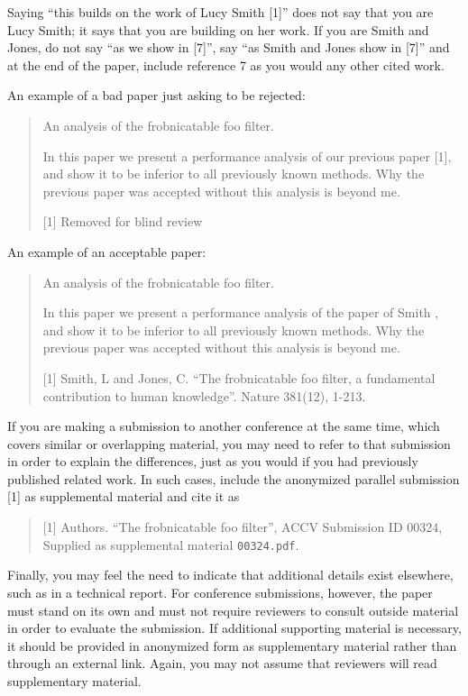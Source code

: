 \documentclass[runningheads]{llncs}
\begin{document}
Saying ``this builds on the work of Lucy Smith [1]'' does not say that you are Lucy Smith;
it says that you are building on her work.
If you are Smith and Jones, do not say ``as we show in [7]'', say ``as Smith and Jones show in [7]'' and at the end of the paper, include reference 7 as you would any other cited work.

An example of a bad paper just asking to be rejected:
\begin{quote}
  \begin{center}
      An analysis of the frobnicatable foo filter.
  \end{center}

   In this paper we present a performance analysis of our previous paper [1], and show it to be inferior to all previously known methods.
   Why the previous paper was accepted without this analysis is beyond me.

   [1] Removed for blind review
\end{quote}

An example of an acceptable paper:
\begin{quote}
  \begin{center}
     An analysis of the frobnicatable foo filter.
  \end{center}

   In this paper we present a performance analysis of the  paper of Smith \etal [1], and show it to be inferior to all previously known methods.
   Why the previous paper was accepted without this analysis is beyond me.

   [1] Smith, L and Jones, C. ``The frobnicatable foo filter, a fundamental contribution to human knowledge''. Nature 381(12), 1-213.
\end{quote}

If you are making a submission to another conference at the same time, which covers similar or overlapping material, you may need to refer to that submission in order to explain the differences, just as you would if you had previously published related work.
In such cases, include the anonymized parallel submission [1] as supplemental material and cite it as
\begin{quote}
  [1] Authors. ``The frobnicatable foo filter'', ACCV \ACCVyear Submission ID 00324, Supplied as supplemental material {\tt 00324.pdf}.
\end{quote}

Finally, you may feel the need to indicate that additional details exist elsewhere, such as in a technical report.
For conference submissions, however, the paper must stand on its own and must not require reviewers to consult outside material in order to evaluate the submission.
If additional supporting material is necessary, it should be provided in anonymized form as supplementary material rather than through an external link.
Again, you may not assume that reviewers will read supplementary material.
\end{document}
